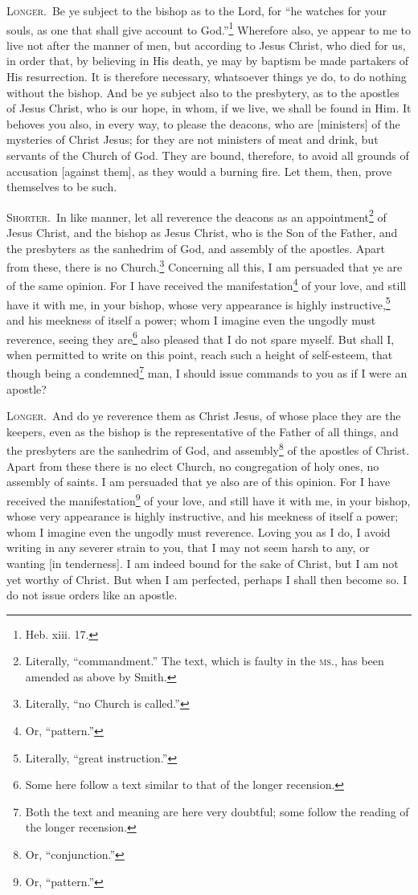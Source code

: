 \textsc{Longer.}~Be ye subject to the bishop as to the Lord, for “he watches for your souls, as one that shall give account to God.”\footnote{Heb. xiii. 17.} Wherefore also, ye appear to me to live not after the manner of men, but according to Jesus Christ, who died for us, in order that, by believing in His death, ye may by baptism be made partakers of His resurrection. It is therefore necessary, whatsoever things ye do, to do nothing without the bishop. And be ye subject also to the presbytery, as to the apostles of Jesus Christ, who is our hope, in whom, if we live, we shall be found in Him. It behoves you also, in every way, to please the deacons, who are [ministers] of the mysteries of Christ Jesus; for they are not ministers of meat and drink, but servants of the Church of God. They are bound, therefore, to avoid all grounds of accusation [against them], as they would a burning fire. Let them, then, prove themselves to be such.


\textsc{Shorter.}~In like manner, let all reverence the deacons as an appointment\footnote{Literally, “commandment.” The text, which is faulty in the \textsc{ms.}, has been amended as above by Smith.} of Jesus Christ, and the bishop as Jesus Christ, who is the Son of the Father, and the presbyters as the sanhedrim of God, and assembly of the apostles. Apart from these, there is no Church.\footnote{Literally, “no Church is called.”} Concerning all this, I am persuaded that ye are of the same opinion. For I have received the manifestation\footnote{Or, “pattern.”} of your love, and still have it with me, in your bishop, whose very appearance is highly instructive,\footnote{Literally, “great instruction.”} and his meekness of itself a power; whom I imagine even the ungodly must reverence, seeing they are\footnote{Some here follow a text similar to that of the longer recension.} also pleased that I do not spare myself. But shall I, when permitted to write on this point, reach such a height of self-esteem, that though being a condemned\footnote{Both the text and meaning are here very doubtful; some follow the reading of the longer recension.} man, I should issue commands to you as if I were an apostle?

\textsc{Longer.}~And do ye reverence them as Christ Jesus, of whose place they are the keepers, even as the bishop is the representative of the Father of all things, and the presbyters are the sanhedrim of God, and assembly\footnote{Or, “conjunction.”} of the apostles of Christ. Apart from these there is no elect Church, no congregation of holy ones, no assembly of saints. I am persuaded that ye also are of this opinion. For I have received the manifestation\footnote{Or, “pattern.”} of your love, and still have it with me, in your bishop, whose very appearance is highly instructive, and his meekness of itself a power; whom I imagine even the ungodly must reverence. Loving you as I do, I avoid writing in any severer strain to you, that I may not seem harsh to any, or wanting [in tenderness]. I am indeed bound for the sake of Christ, but I am not yet worthy of Christ. But when I am perfected, perhaps I shall then become so. I do not issue orders like an apostle.

